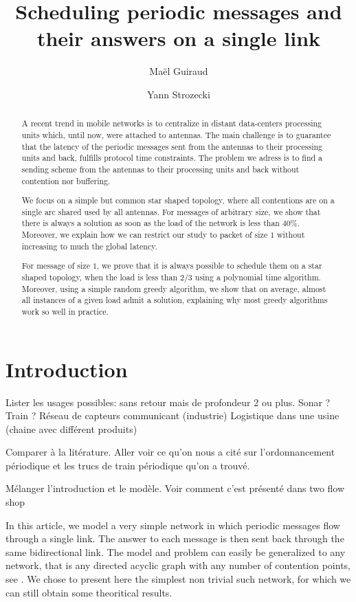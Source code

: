 \documentclass[10pt, conference, letterpaper]{IEEEtran}
\title{Scheduling periodic messages and their answers on a single link}
\author[1,2]{Ma\"el Guiraud}
\author[1]{Yann Strozecki}
\affil[1]{David Laboratory, UVSQ}
\affil[2]{Nokia Bell Labs France}
\begin{document}
\maketitle

\begin{abstract}

A recent trend in mobile networks is to centralize in distant data-centers processing units which, until now, were attached to antennas. The main challenge is to guarantee that the latency of the periodic messages sent from the antennas to their processing units and back, fulfills protocol time constraints. The problem we adress is to find a sending scheme from the antennas to their processing units and back without contention nor buffering.

We focus on a simple but common star shaped topology, where all contentions are on a single arc shared used by all antennas. For messages of arbitrary size, we show that there is always a solution as soon as the load of the network is less than $40\%$. Moreover, we explain how we can restrict our study to packet of size $1$ without increasing to much the global latency. 

For message of size $1$, we prove that it is always possible to schedule them on a star shaped topology, when the load is less than $2/3$ using a polynomial time algorithm.
Moreover, using a simple random greedy algorithm, we show that on average, almost all
instances of a given load admit a solution, explaining why most greedy algorithms work so well in practice.  
\end{abstract}


\section{Introduction}

Lister les usages possibles: 
sans retour mais de profondeur 2 ou plus. Sonar ? Train ?
Réseau de capteurs communicant (industrie)
Logistique dans une usine (chaine avec différent produits)

Comparer à la litérature. Aller voir ce qu'on nous a cité sur l'ordonnancement périodique 
et les trucs de train périodique qu'on a trouvé.



Mélanger l'introduction et le modèle. Voir comment c'est présenté dans two flow shop

In this article, we model a very simple network in which periodic messages flow through a single link. The answer to each message is then sent back through the same bidirectional link. The model and problem can easily be generalized to any network, that is any directed acyclic graph with any number of contention points, see \cite{dominique2018deterministic}. We chose to present here the simplest non trivial such network, for which we can still obtain some theoritical results. 
\end{document}
